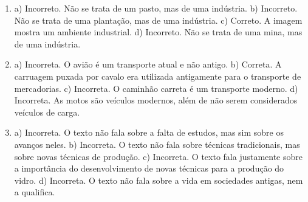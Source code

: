 

\begin{enumerate}

\item
a) Incorreto. Não se trata de um pasto, mas de uma indústria.
b) Incorreto. Não se trata de uma plantação, mas de uma indústria.
c) Correto. A imagem mostra um ambiente industrial.
d) Incorreto. Não se trata de uma mina, mas de uma indústria.

\item
a) Incorreta. O avião é um transporte atual e não antigo.
b) Correta. A carruagem puxada por cavalo era utilizada antigamente para o
transporte de mercadorias.
c) Incorreta. O caminhão carreta é um transporte moderno.
d) Incorreta. As motos são veículos modernos, além de não serem considerados veículos de carga.

\item
a) Incorreta. O texto não fala sobre a falta de estudos, mas sim sobre
os avanços neles.
b) Incorreta. O texto não fala sobre técnicas tradicionais, mas sobre
novas técnicas de produção.
c) Incorreta. O texto fala justamente sobre a importância do
desenvolvimento de novas técnicas para a produção do vidro.
d) Incorreta. O texto não fala sobre a vida em sociedades antigas, nem a
qualifica.
\end{enumerate}



